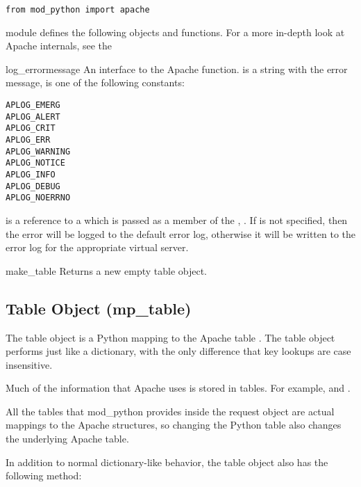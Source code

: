 \begin{verbatim}
from mod_python import apache
\end{verbatim}

 module defines the following objects and
functions. For a more in-depth look at Apache internals, see the

\begin{funcdesc}{log_error}{message}
An interface to the Apache
function.  is a string with the error message,  is
one of the following constants:

\begin{verbatim}
APLOG_EMERG
APLOG_ALERT
APLOG_CRIT
APLOG_ERR
APLOG_WARNING
APLOG_NOTICE
APLOG_INFO
APLOG_DEBUG
APLOG_NOERRNO
\end{verbatim}            
      
 is a reference to a  which is 
passed as a member of the , . If
 is not specified, then the error will be logged to the default
error log, otherwise it will be written to the error log for the
appropriate virtual server.
\end{funcdesc}

\begin{funcdesc}{make_table}{}
Returns a new empty table object. 
\end{funcdesc}

\subsection{Table Object (mp_table)\label{pyapi-mptable}}

The table object is a Python mapping to the Apache table . The table
object performs just like a dictionary, with the only difference that
key lookups are case insensitive.

Much of the information that Apache uses is stored in tables. For
example,  and .

All the tables that mod_python provides inside the request object are
actual mappings to the Apache structures, so changing the Python table
also changes the underlying Apache table.

In addition to normal dictionary-like behavior, the table object also
has the following method:

